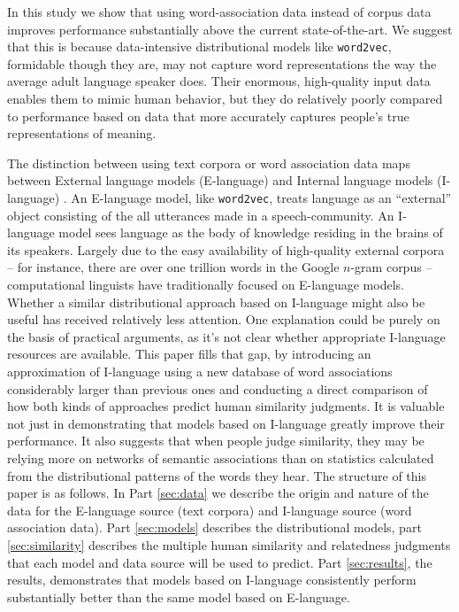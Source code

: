 \documentclass{article}
\begin{document}
In this study we show that using word-association data instead of corpus data improves performance substantially above the current state-of-the-art. We suggest that this is because data-intensive distributional models like \texttt{word2vec}, formidable though they are, may not capture word representations the way the average adult language speaker does. Their enormous, high-quality input data enables them to mimic human behavior, but they do relatively poorly compared to performance based on data that more accurately captures people's true representations of meaning.

The distinction between using text corpora or word association data maps between External language models (E-language) and Internal language models (I-language)  \cite{Taylor2012mental}. An E-language model, like \texttt{word2vec}, treats language as an ``external'' object consisting of the all utterances made in a speech-community. An I-language model sees language as the body of knowledge residing in the brains of its speakers. Largely due to the easy availability of high-quality external corpora -- for instance, there are over one trillion words in the Google $n$-gram corpus \cite{Michel2011} -- computational linguists have traditionally focused on E-language models. Whether a similar distributional approach based on I-language might also be useful has received relatively less attention.
One explanation could be purely on the basis of practical arguments, as it's not clear whether appropriate I-language resources are available.
This paper fills that gap, by introducing an approximation of I-language using a new database of word associations considerably larger than previous ones and conducting a direct comparison of how both kinds of approaches predict human similarity judgments. It is valuable not just in demonstrating that models based on I-language greatly improve their performance. It also suggests that when people judge similarity, they may be relying more on networks of semantic associations than on statistics calculated from the distributional patterns of the words they hear.
The structure of this paper is as follows. In Part \ref{sec:data} we describe the origin and nature of the data for the E-language source (text corpora) and I-language source (word association data). Part \ref{sec:models} describes the distributional models, part \ref{sec:similarity} describes the multiple human similarity and relatedness judgments that each model and data source will be used to predict. Part \ref{sec:results}, the results, demonstrates that models based on I-language consistently perform substantially better than the same model based on E-language.
\end{document}
